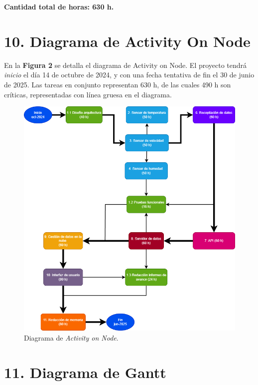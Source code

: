 \documentclass[
11pt, %
]{charter}
\begin{document}
\textbf{Cantidad total de horas: 630 h.}

\newpage

\section{10. Diagrama de Activity On Node}
\label{sec:AoN}

En la \textbf{Figura 2} se detalla el diagrama de Activity on Node. El proyecto tendrá \textit{inicio} el día 14 de octubre de 2024, y con una fecha tentativa de fin el 30 de junio de 2025. Las tareas en conjunto representan 630 h, de las cuales 490 h son críticas, representadas con línea gruesa en el diagrama.

\begin{figure}[htpb]
\centering 
\includegraphics[width=.8\textwidth]{./Figuras/AoN_project.png}
\caption{Diagrama de \textit{Activity on Node}.}
\label{fig:AoN}
\end{figure}

\newpage

\section{11. Diagrama de Gantt}
\label{sec:gantt}
\end{document}
